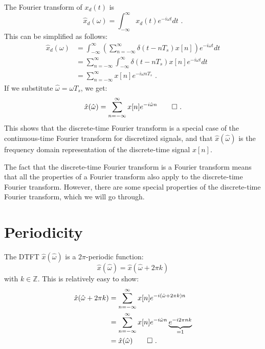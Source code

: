 The Fourier transform of $x_d(t)$ is
\begin{equation}
    \hat{x}_d(\omega) = \int_{-\infty}^{\infty} x_d(t) e^{-i\omega t}dt\,\,.
    \label{ctft}
\end{equation}
This can be simplified as follows:
\begin{align}
    \hat{x}_d(\omega) & =\int_{-\infty}^{\infty} \left(\sum_{n=-\infty}^{\infty} \delta(t- nT_s) x[n]\right) e^{-i\omega t}dt \\
                      & =\sum_{n=-\infty}^{\infty} \int_{-\infty}^{\infty} \delta(t-nT_s) x[n] e^{-i\omega t}dt               \\
                      & = \sum_{n=-\infty}^{\infty} x[n] e^{- i \omega n T_s}\label{eq:dtftd1}\,\,.
\end{align}
If we substitute $\hat{\omega}=\omega T_s$, we get:
\begin{equation}
    \hat{x}(\hat{\omega}) = \sum_{n=-\infty}^{\infty} x[n] e^{- i \hat{\omega} n}\qed\,\,.
\end{equation}
This shows that the discrete-time
Fourier transform is a special case of the continuous-time Fourier
transform for discretized signals, and that $\hat{x}(\hat{\omega})$ is
the frequency domain representation of the discrete-time signal
$x[n]$.

The fact that the discrete-time Fourier transform is a Fourier
transform means that all the properties of a Fourier transform also
apply to the discrete-time Fourier transform. However, there are some
special properties of the discrete-time Fourier transform, which we
will go through.

\section{Periodicity}

The DTFT $\hat{x}(\hat{\omega})$ is a $2\pi$-periodic function:
\begin{equation}
    \boxed{
        \hat{x}(\hat{\omega})=\hat{x}(\hat{\omega}+2\pi k)
    }
\end{equation}
with $k \in \mathbb{Z}$. This is relatively easy to show:
\begin{align}
    \hat{x}(\hat{\omega}+2\pi k) & = \sum_{n=-\infty}^{\infty} x[n]e^{-i(\hat{\omega}+2\pi k)n}                         \\
                                 & = \sum_{n=-\infty}^{\infty} x[n]e^{-i\hat{\omega}n} \underbrace{e^{-i 2\pi nk}}_{=1} \\
                                 & = \hat{x}(\hat{\omega})\qed\,\,.
\end{align}

